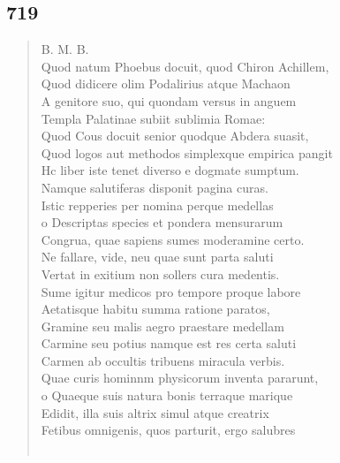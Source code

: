 \documentclass[11pt, a4paper]{report}
\begin{document}
            \subsection*{719}
      \begin{verse}
      B. M. B. \\ Quod natum Phoebus docuit, quod Chiron Achillem, \\ Quod didicere olim Podalirius atque Machaon \\ A genitore suo, qui quondam versus in anguem \\ Templa Palatinae subiit sublimia Romae: \\ Quod Cous docuit senior quodque Abdera suasit, \\ Quod logos aut methodos simplexque empirica pangit \\ Hc liber iste tenet diverso e dogmate sumptum. \\ Namque salutiferas disponit pagina curas. \\ Istic repperies per nomina perque medellas \\ o Descriptas species et pondera mensurarum \\ Congrua, quae sapiens sumes moderamine certo. \\ Ne fallare, vide, neu quae sunt parta saluti \\ Vertat in exitium non sollers cura medentis. \\ Sume igitur medicos pro tempore proque labore \\ Aetatisque habitu summa ratione paratos, \\ Gramine seu malis aegro praestare medellam \\ Carmine seu potius namque est res certa saluti \\ Carmen ab occultis tribuens miracula verbis. \\ Quae curis hominnm physicorum inventa pararunt, \\ o Quaeque suis natura bonis terraque marique \\ Edidit, illa suis altrix simul atque creatrix \\ Fetibus omnigenis, quos parturit, ergo salubres \\ 
        ﻿\pagebreak 

\end{verse}
\end{document}
